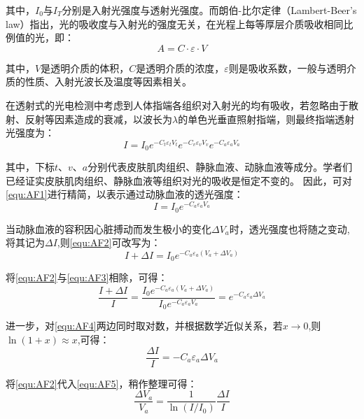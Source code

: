 其中，$I_{0}$与$I_{T}$分别是入射光强度与透射光强度。而朗伯-比尔定律（Lambert-Beer's law）指出，光的吸收度与入射光的强度无关，在光程上每等厚层介质吸收相同比例值的光，即：
\begin{equation}
    \label{equ:LBL2}
    A=C \cdot \varepsilon \cdot V
\end{equation}

其中，$V$是透明介质的体积，$C$是透明介质的浓度，$\varepsilon$则是吸收系数，一般与透明介质的性质、入射光波长及温度等因素相关。

在透射式的光电检测中考虑到人体指端各组织对入射光的均有吸收，若忽略由于散射、反射等因素造成的衰减，以波长为$\lambda$的单色光垂直照射指端，则最终指端透射光强度为\cite{4122392}：
\begin{equation}
    \label{equ:AF1}
    I=I_{0}e^{-C_{t}\varepsilon _{t}V_{t}}e^{-C_{v}\varepsilon _{v}V_{v}} e^{-C_{a}\varepsilon _{a}V_{a}} 
\end{equation}

其中，下标$t$、$v$、$a$分别代表皮肤肌肉组织、静脉血液、动脉血液等成分。学者们已经证实皮肤肌肉组织、静脉血液等组织对光的吸收是恒定不变的\cite{1980Spectrophotometric,4122392}。
因此，可对\autoref{equ:AF1}进行精简，以表示通过动脉血液的透光强度\cite{PPGYY}：
\begin{equation}
    \label{equ:AF2}
    I=I_{0}e^{-C_{a}\varepsilon _{a}V_{a}} 
\end{equation}

当动脉血液的容积因心脏搏动而发生极小的变化$\Delta V_{a}$时，透光强度也将随之变动,将其记为$\Delta I$,则\autoref{equ:AF2}可改写为：
\begin{equation}
    \label{equ:AF3}
    I+\Delta I=I_{0}e^{-C_{a}\varepsilon _{a}(V_{a}+\Delta V_{a})} 
\end{equation}

将\autoref{equ:AF2}与\autoref{equ:AF3}相除，可得：
\begin{equation}
    \label{equ:AF4}
    \frac{I+\Delta I}{I}=\frac{I_{0}e^{-C_{a}\varepsilon _{a}(V_{a}+\Delta V_{a})}}{I_{0}e^{-C_{a}\varepsilon _{a}V_{a}}}=e^{-C_{a}\varepsilon _{a}\Delta V_{a}} 
\end{equation}

进一步，对\autoref{equ:AF4}两边同时取对数，并根据数学近似关系，若$x\rightarrow 0$,则$\ln(1+x)\approx x$,可得：
\begin{equation}
    \label{equ:AF5}
    \frac{\Delta I}{I}=-C_{a}\varepsilon _{a}\Delta V_{a}
\end{equation}

将\autoref{equ:AF2}代入\autoref{equ:AF5}，稍作整理可得：
\begin{equation}
    \label{equ:AF6}
    \frac{\Delta V_{a}}{V_{a}}=\frac{1}{\ln(I/I_{0})}\frac{\Delta I}{I}
\end{equation}

